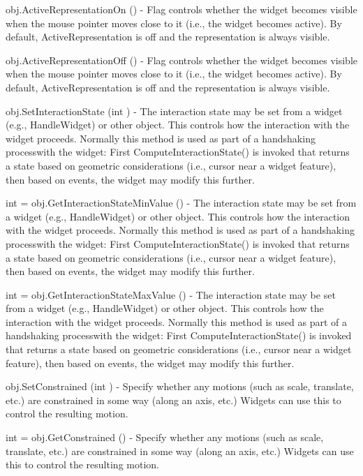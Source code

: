 \begin{DoxyItemize}
\item {\ttfamily obj.\-Active\-Representation\-On ()} -\/ Flag controls whether the widget becomes visible when the mouse pointer moves close to it (i.\-e., the widget becomes active). By default, Active\-Representation is off and the representation is always visible.  
\item {\ttfamily obj.\-Active\-Representation\-Off ()} -\/ Flag controls whether the widget becomes visible when the mouse pointer moves close to it (i.\-e., the widget becomes active). By default, Active\-Representation is off and the representation is always visible.  
\item {\ttfamily obj.\-Set\-Interaction\-State (int )} -\/ The interaction state may be set from a widget (e.\-g., Handle\-Widget) or other object. This controls how the interaction with the widget proceeds. Normally this method is used as part of a handshaking processwith the widget\-: First Compute\-Interaction\-State() is invoked that returns a state based on geometric considerations (i.\-e., cursor near a widget feature), then based on events, the widget may modify this further.  
\item {\ttfamily int = obj.\-Get\-Interaction\-State\-Min\-Value ()} -\/ The interaction state may be set from a widget (e.\-g., Handle\-Widget) or other object. This controls how the interaction with the widget proceeds. Normally this method is used as part of a handshaking processwith the widget\-: First Compute\-Interaction\-State() is invoked that returns a state based on geometric considerations (i.\-e., cursor near a widget feature), then based on events, the widget may modify this further.  
\item {\ttfamily int = obj.\-Get\-Interaction\-State\-Max\-Value ()} -\/ The interaction state may be set from a widget (e.\-g., Handle\-Widget) or other object. This controls how the interaction with the widget proceeds. Normally this method is used as part of a handshaking processwith the widget\-: First Compute\-Interaction\-State() is invoked that returns a state based on geometric considerations (i.\-e., cursor near a widget feature), then based on events, the widget may modify this further.  
\item {\ttfamily obj.\-Set\-Constrained (int )} -\/ Specify whether any motions (such as scale, translate, etc.) are constrained in some way (along an axis, etc.) Widgets can use this to control the resulting motion.  
\item {\ttfamily int = obj.\-Get\-Constrained ()} -\/ Specify whether any motions (such as scale, translate, etc.) are constrained in some way (along an axis, etc.) Widgets can use this to control the resulting motion.  

\end{DoxyItemize}

